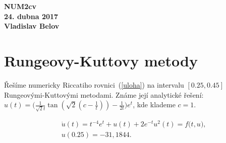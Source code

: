 \documentclass[11pt,american,czech]{article}
\begin{document}
\def\documentdate{24. dubna 2017}
\begin{flushright}
\textbf{	NUM2cv \\
	24. dubna 2017 \\
	Vladislav Belov}
\end{flushright}

\section{Rungeovy-Kuttovy metody}

Řešíme numericky Riccatiho rovnici~(\ref{uloha}) na intervalu $[0.25, 0.45]$ Rungeovými-Kuttovými metodami. Známe její analytické řešení: $u(t)=\big(\frac{1}{\sqrt{2}t}\tan{(\sqrt{2}(c-\frac{1}{t}))}-\frac{1}{2t}\big)e^{t}$, kde klademe $c=1$.

\begin{equation} \label{uloha}
	\begin{split}
		&\dot{u}(t)=t^{-4}e^{t}+u(t)+2e^{-t}u^{2}(t) = f\big(t, u\big), \\
		&u(0.25)=-31,1844.
	\end{split}
\end{equation}
\end{document}
